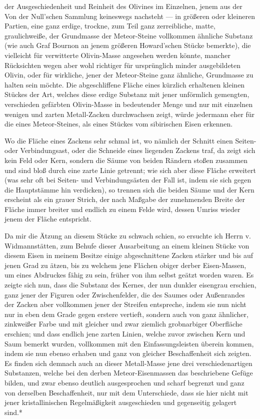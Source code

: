 \documentclass[a4paper, 11pt, oneside, german]{article}
\begin{document}
der Ausgeschiedenheit und Reinheit des Olivines im Einzelnen, jenem aus der Von der Null'schen Sammlung keineswegs nachsteht --- in größeren oder kleineren Partien, eine ganz erdige, trockne, zum Teil ganz zerreibliche, matte, graulichweiße, der Grundmasse der Meteor-Steine vollkommen ähnliche Substanz (wie auch Graf Bournon an jenem größeren Howard'schen Stücke bemerkte), die vielleicht für verwitterte Olivin-Masse angesehen werden könnte, mancher Rücksichten wegen aber wohl richtiger für ursprünglich minder ausgebildeten Olivin, oder für wirkliche, jener der Meteor-Steine ganz ähnliche, Grundmasse zu halten sein möchte. Die abgeschliffene Fläche eines kürzlich erhaltenen kleinen Stückes der Art, welches diese erdige Substanz mit jener unförmlich gemengten, verschieden gefärbten Olivin-Masse in bedeutender Menge und nur mit einzelnen wenigen und zarten Metall-Zacken durchwachsen zeigt, würde jedermann eher für die eines Meteor-Steines, als eines Stückes vom sibirischen Eisen erkennen.

Wo die Fläche eines Zackens sehr schmal ist, wo nämlich der Schnitt einen Seiten- oder Verbindungsast, oder die Schneide eines liegenden Zackens traf, da zeigt sich kein Feld oder Kern, sondern die Säume von beiden Rändern stoßen zusammen und sind bloß durch eine zarte Linie getrennt; wie sich aber diese Fläche erweitert (was sehr oft bei Seiten- und Verbindungsästen der Fall ist, indem sie sich gegen die Hauptstämme hin verdicken), so trennen sich die beiden Säume und der Kern erscheint als ein grauer Strich, der nach Maßgabe der zunehmenden Breite der Fläche immer breiter und endlich zu einem Felde wird, dessen Umriss wieder jenem der Fläche entspricht.

Da mir die Ätzung an diesem Stücke zu schwach schien, so ersuchte ich Herrn v. Widmannstätten, zum Behufe dieser Ausarbeitung an einem kleinen Stücke von diesem Eisen in meinem Besitze einige abgeschnittene Zacken stärker und bis auf jenen Grad zu ätzen, bis zu welchem jene Flächen obiger derber Eisen-Massen, um eines Abdruckes fähig zu sein, früher von ihm selbst geätzt worden waren. Es zeigte sich nun, dass die Substanz des Kernes, der nun dunkler eisengrau erschien, ganz jener der Figuren oder Zwischenfelder, die des Saumes oder Außenrandes der Zacken aber vollkommen jener der Streifen entspreche, indem sie nun nicht nur in eben dem Grade gegen erstere vertieft, sondern auch von ganz ähnlicher, zinkweißer Farbe und mit gleicher und zwar ziemlich grobnarbiger Oberfläche erschien; und dass endlich jene zarten Linien, welche zuvor zwischen Kern und Saum bemerkt wurden, vollkommen mit den Einfassungsleisten überein kommen, indem sie nun ebenso erhaben und ganz von gleicher Beschaffenheit sich zeigten. Es finden sich demnach auch an dieser Metall-Masse jene drei verschiedenartigen Substanzen, welche bei den derben Meteor-Eisenmassen das beschriebene Gefüge bilden, und zwar ebenso deutlich ausgesprochen und scharf begrenzt und ganz von derselben Beschaffenheit, nur mit dem Unterschiede, dass sie hier nicht mit jener kristallinischen Regelmäßigkeit ausgeschieden und gegenseitig gelagert sind.*
\end{document}
